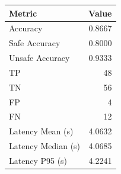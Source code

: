 \begin{table}[ht]
\centering
\begin{tabular}{lr}
\toprule
Metric & Value \\
\midrule
Accuracy & 0.8667 \\
Safe Accuracy & 0.8000 \\
Unsafe Accuracy & 0.9333 \\
TP & 48 \\
TN & 56 \\
FP & 4 \\
FN & 12 \\
Latency Mean (s) & 4.0632 \\
Latency Median (s) & 4.0685 \\
Latency P95 (s) & 4.2241 \\
\bottomrule
\end{tabular}
\end{table}